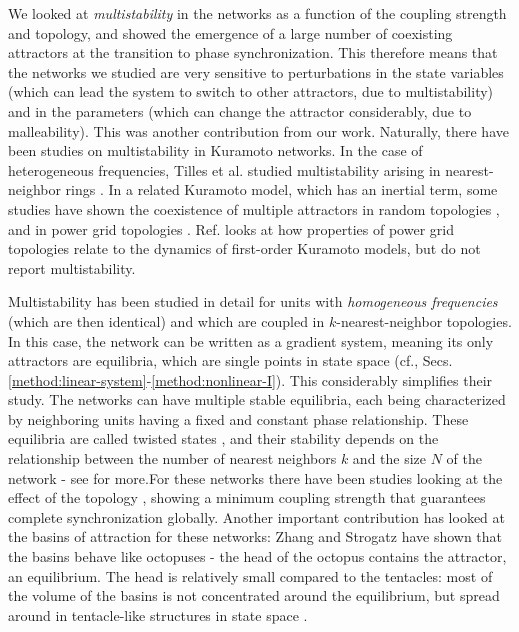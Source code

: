 We looked at \textit{multistability} in the networks as a function of the coupling strength and topology, and showed the emergence of a large number of coexisting attractors at the transition to phase synchronization. This therefore means that the networks we studied are very sensitive to perturbations in the state variables (which can lead the system to switch to other attractors, due to multistability) and in the parameters (which can change the attractor considerably, due to malleability). This was another contribution from our work. Naturally, there have been studies on multistability in Kuramoto networks. In the case of heterogeneous frequencies, Tilles et al. studied multistability arising in nearest-neighbor rings \cite{tilles2011multistable}. In a related Kuramoto model, which has an inertial term, some studies have shown the coexistence of multiple attractors in random topologies \cite{gelbrecht2020monte}, and in power grid topologies \cite{hellmann2020network, halekotte2021transient}. Ref. \cite{potratzki2024synchronization} looks at how properties of power grid topologies relate to the dynamics of first-order Kuramoto models, but do not report multistability.

Multistability has been studied in detail for units with \textit{homogeneous frequencies} (which are then identical) and which are coupled in $k$-nearest-neighbor topologies. In this case, the network can be written as a gradient system, meaning its only attractors are equilibria, which are single points in state space (cf., Secs. \ref{method:linear-system}-\ref{method:nonlinear-I}). This considerably simplifies their study. The networks can have multiple stable equilibria, each being characterized by neighboring units having a fixed and constant phase relationship. These equilibria are called twisted states \cite{wiley2006the}, and their stability depends on the relationship between the number of nearest neighbors $k$ and the size $N$ of the network \cite{wiley2006the} - see  for more.For these networks there have been studies looking at the effect of the topology \cite{townsend2020dense}, showing a minimum coupling strength that guarantees complete synchronization globally. Another important contribution has looked at the basins of attraction for these networks: Zhang and Strogatz have shown that the basins behave like octopuses - the head of the octopus contains the attractor, an equilibrium. The head is relatively small compared to the tentacles: most of the volume of the basins is not concentrated around the equilibrium, but spread around in tentacle-like structures in state space \cite{zhang2021basins}. 

